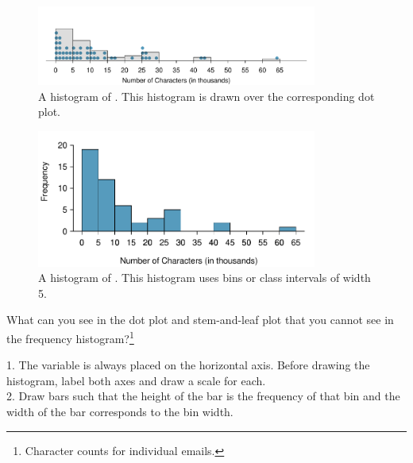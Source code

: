 \begin{figure}[bth]
   \centering
   \includegraphics[width=0.82\textwidth]{ch_summarizing_data/figures/emailCharactersDotPlot/emailCharactersDotPlotStackedRoundedHist}
   \caption{A histogram of . This histogram is drawn over the corresponding dot plot.}
   \label{emailCharactersDotPlotStackedRoundedHist}
\end{figure}

\begin{figure}[bth]
   \centering
   \includegraphics[width=0.82\textwidth]{ch_summarizing_data/figures/email50NumCharHist/email50NumCharHist}
   \caption{A histogram of . This histogram uses bins or class intervals of width 5.}
   \label{email50NumCharHist}
\end{figure}

\begin{exercise}
What can you see in the dot plot and stem-and-leaf plot that you cannot see in the frequency histogram?\footnote{Character counts for individual emails.}
\end{exercise}

\begin{tipBox}{
1. The variable is always placed on the horizontal axis. Before drawing the histogram, label both axes and draw a scale for each. \\[2mm]
2. Draw bars such that the height of the bar is the frequency of that bin and the width of the bar corresponds to the bin width.}
\end{tipBox}

